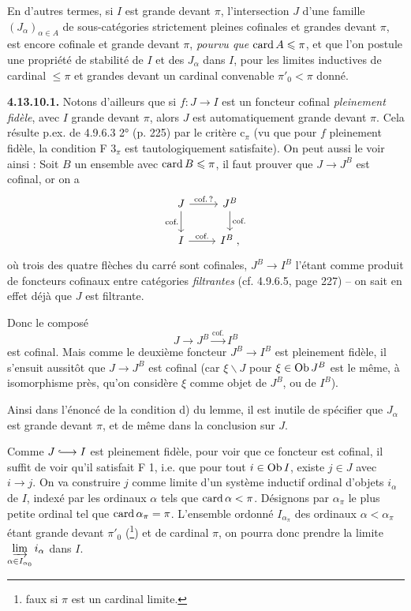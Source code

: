 En d'autres termes, si $I$ est grande devant $\pi$, l'intersection $J$ d'une famille $(J_\alpha)_{\alpha\in A}$ de sous-catégories strictement pleines cofinales et grandes devant $\pi$, est encore
cofinale et grande devant $\pi$, \textit{pourvu que} $\operatorname{card} A\leqslant\pi$, et que l'on postule une propriété de stabilité de $I$ et des $J_\alpha$ dans $I$, pour les limites inductives de cardinal $\leqslant\pi$ et grandes devant un cardinal convenable $\pi'_0<\pi$ donné.

\textbf{4.13.10.1.} Notons d'ailleurs que si $f : J\longrightarrow I$ est un foncteur cofinal \textit{pleinement fidèle}, avec $I$ grande devant $\pi$, alors $J$ est automatiquement grande devant $\pi$. Cela résulte p.ex. de 4.9.6.3 2° (p. 225) par le critère $\mathrm{c}_\pi$ (vu que pour $f$ pleinement fidèle, la condition F $3_\pi$ est tautologiquement satisfaite). On peut aussi le voir ainsi : Soit $B$ un ensemble avec $\operatorname{card} B\leqslant\pi$, il faut prouver que $J\longrightarrow J^B$ est cofinal, or on a
\[
\begin{tikzcd}
J \arrow[r, "\text{cof.\,?}"] \arrow[d, "\text{cof.}"'] & J^B \arrow[d, "\text{cof.}"] \\
I \arrow[r, "\text{cof.}"] & I^B \; ,
\end{tikzcd}
\]
où trois des quatre flèches du carré sont cofinales, $J^B\longrightarrow I^B$ l'étant comme produit de foncteurs cofinaux entre catégories \textit{filtrantes} (cf. 4.9.6.5, page 227) -- on sait en effet déjà que $J$ est filtrante.

Donc le composé
\[ J \longrightarrow J^B \xrightarrow{\text{cof.}} I^B \]
est cofinal. Mais comme le deuxième foncteur $J^B\longrightarrow I^B$ est pleinement fidèle, il s'ensuit aussitôt que $J\longrightarrow J^B$ est cofinal (car $\xi\backslash J$ pour $\xi\in\operatorname{Ob} J^B$ est le même, à isomorphisme près, qu'on considère $\xi$ comme objet de $J^B$, ou de $I^B$).

Ainsi dans l'énoncé de la condition d) du lemme, il est inutile de spécifier que $J_\alpha$ est grande devant $\pi$, et de même dans la conclusion sur $J$.

Comme $J\incl I$ est pleinement fidèle, pour voir que ce foncteur est cofinal, il suffit de voir qu'il satisfait F 1, i.e. que pour tout $i\in\operatorname{Ob} I$, existe $j\in J$ avec $i\longrightarrow j$. On va construire $j$ comme limite d'un système inductif ordinal d'objets $i_\alpha$ de $I$, indexé par les ordinaux $\alpha$ tels que $\operatorname{card}\alpha<\pi$. Désignons par $\alpha_\pi$ le plus petite ordinal tel que %
$\operatorname{card}\alpha_\pi=\pi$. L'ensemble ordonné $I_{\alpha_\pi}$ des ordinaux $\alpha<\alpha_\pi$ étant grande devant $\pi'_0$ (\footnote[129]{faux si $\pi$ est un cardinal limite.}) et de cardinal $\pi$, on pourra donc prendre la limite $\varinjlim\limits_{\alpha\in I_{\alpha_0}} i_\alpha$ dans $I$. %

